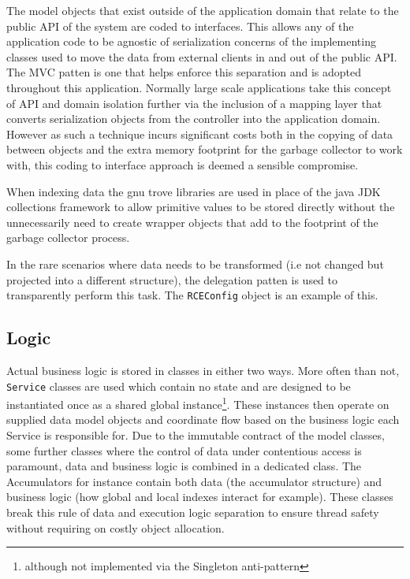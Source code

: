 \documentclass[a4paper,11pt]{scrreprt}
\begin{document}
The model objects that exist outside of the application domain that relate to the public API of the system are coded to interfaces. This allows any of the application code to be agnostic of serialization concerns of the implementing classes used to move the data from external clients in and out of the public API. The MVC patten is one that helps enforce this separation and is adopted throughout this application. Normally large scale applications take this concept of API and domain isolation further via the inclusion of a mapping layer that converts serialization objects from the controller into the application domain. However as such a technique incurs significant costs both in the copying of data between objects and the extra memory footprint for the garbage collector to work with, this coding to interface approach is deemed a sensible compromise. 

When indexing data the gnu trove libraries are used in place of the java JDK collections framework to allow primitive values to be stored directly without the unnecessarily need to create wrapper objects that add to the footprint of the garbage collector process.

In the rare scenarios where data needs to be transformed (i.e not changed but projected into a different structure), the delegation patten\cite{design-patterns} is used to transparently perform this task. The \verb|RCEConfig| object is an example of this.
\subsection{Logic}
Actual business logic is stored in classes in either two ways. More often than not, \verb|Service| classes are used which contain no state and are designed to be instantiated once as a shared global instance\footnote{although not implemented via the Singleton anti-pattern}. These instances then operate on supplied data model objects and coordinate flow based on the business logic each Service is responsible for. Due to the immutable contract of the model classes, some further classes where the control of data under contentious access is paramount, data and business logic is combined in a dedicated class. The Accumulators for instance contain both data (the accumulator structure) and business logic (how global and local indexes interact for example). These classes break this rule of data and execution logic separation to ensure thread safety without requiring on costly object allocation. 
\end{document}
